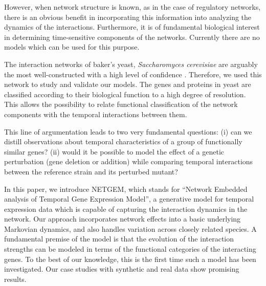 \documentclass{bioinfo}
\begin{document}
However, when network structure is known, as in the case of regulatory
networks, there is an obvious benefit in incorporating this
information into analyzing the dynamics of the
interactions. Furthermore, it is of fundamental biological interest in
determining time-sensitive components of the networks. Currently there are no models which can be used for this purpose.


The interaction networks of baker's
yeast, {\it Saccharomyces cerevisiae} are arguably the most
well-constructed with a high level of confidence
\citep{Petranovic2009}. Therefore, we used this network 
to study and validate our models. 
The genes and proteins in yeast are classified according to their biological function \citep{Mewes2007} to a high degree of resolution. This allows the possibility to relate functional classification of the network components with the temporal interactions between them.

This line of argumentation leads to two very fundamental questions: (i) can we distill observations about temporal characteristics of a group of functionally similar genes? (ii) would it be possible to model the effect of a genetic perturbation (gene deletion or addition) while comparing temporal interactions between the reference strain and its perturbed mutant? 

In this paper, we introduce NETGEM, which stands for ``Network Embedded
  analysis of Temporal Gene Expression Model'',  a generative model for
temporal expression data which is capable of 
capturing the interaction dynamics in the network. Our approach
incorporates network effects into a basic underlying Markovian dynamics, and
also handles variation across closely related species.  A fundamental premise of
the model is that the evolution of the interaction strengths can be
modeled in terms of the functional categories of the interacting
genes. To the best of our knowledge, this is the first time such a
model has been investigated. Our case studies with synthetic and real
data show promising results. 
\end{document}

